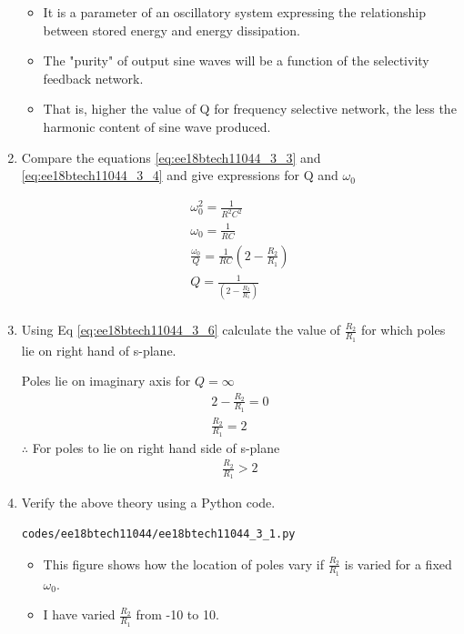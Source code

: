 \begin{enumerate}[label=\arabic*.,ref=\theenumi]
\solution

\begin{itemize}
    \item It is a parameter of an oscillatory system expressing the relationship between stored energy and energy dissipation.
    \item The "purity" of output sine waves will be a function of the selectivity feedback network.
    \item That is, higher the value of Q for frequency selective network, the less the harmonic content of sine wave produced.
\end{itemize}
 


\item 
Compare the equations \ref{eq:ee18btech11044_3_3} and \ref{eq:ee18btech11044_3_4} and give expressions for Q and $\omega_0$

\solution
\begin{align}
    \omega_0^2 = \frac{1}{R^2C^2} \\
    \omega_0 = \frac{1}{RC} \label{eq:ee18btech11044_3_5} \\
    \frac{\omega_0}{Q} = \frac{1}{RC}(2 - \frac{R_2}{R_1}) \\
    Q = \frac{1}{(2 - \frac{R_2}{R_1})} \label{eq:ee18btech11044_3_6} \\
\end{align}
\item 
Using Eq \ref{eq:ee18btech11044_3_6} calculate the value of $\frac{R_2}{R_1}$ for which poles lie on right hand of s-plane.

\solution 

Poles lie on imaginary axis for $Q = \infty$
\begin{align}
    2 - \frac{R_2}{R_1} = 0 \\
    \frac{R_2}{R_1} = 2
\end{align}
$\therefore$ For poles to lie on right hand side of s-plane
\begin{align}
    \frac{R_2}{R_1} >2
\end{align}


\item
Verify the above theory using a Python code.

\solution

\begin{lstlisting}
codes/ee18btech11044/ee18btech11044_3_1.py
\end{lstlisting}
\begin{itemize}
    \item This figure shows how the location of poles vary if $\frac{R_2}{R_1}$ is varied for a fixed $\omega_0$.
    \item I have varied $\frac{R_2}{R_1}$ from -10 to 10. 
\end{itemize}


\end{enumerate}
